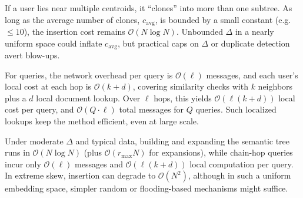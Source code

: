 \documentclass[10pt,journal]{IEEEtran}
\newcommand{\todo}[1]{\textcolor{red}{\textbf{[TODO: #1]}}}
\begin{document}
\label{paragraph:cloning_complexity}
If a user lies near multiple centroids, it “clones” into more than one subtree. As long as the average number of clones, $c_{\text{avg}}$, is bounded by a small constant (e.g.\ $\leq 10$), the insertion cost remains $\mathcal{O}(N \log N)$. Unbounded $\Delta$ in a nearly uniform space could inflate $c_{\text{avg}}$, but practical caps on $\Delta$ or duplicate detection avert blow-ups.

For queries, the network overhead per query is $\mathcal{O}(\ell)$ messages, and each user’s local cost at each hop is $\mathcal{O}(k + d)$, covering similarity checks with $k$ neighbors plus a $d$ local document lookup. Over $\ell$ hops, this yields $\mathcal{O}(\ell (k + d))$ local cost per query, and $\mathcal{O}(Q \cdot \ell)$ total messages for $Q$ queries. Such localized lookups keep the method efficient, even at large scale.

Under moderate $\Delta$ and typical data, building and expanding the semantic tree runs in $\mathcal{O}(N \log N)$ (plus $\mathcal{O}(r_{\max} N)$ for expansions), while chain-hop queries incur only $\mathcal{O}(\ell)$ messages and $\mathcal{O}(\ell (k + d))$ local computation per query. In extreme skew, insertion can degrade to $\mathcal{O}(N^2)$, although in such a uniform embedding space, simpler random or flooding-based mechanisms might suffice. 




\end{document}
